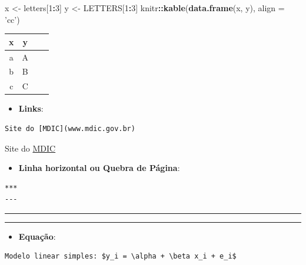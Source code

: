 \documentclass[]{book}
\newenvironment{Shaded}{\begin{snugshade}}{\end{snugshade}}
\newcommand{\KeywordTok}[1]{\textcolor[rgb]{0.13,0.29,0.53}{\textbf{#1}}}
\newcommand{\DataTypeTok}[1]{\textcolor[rgb]{0.13,0.29,0.53}{#1}}
\newcommand{\DecValTok}[1]{\textcolor[rgb]{0.00,0.00,0.81}{#1}}
\newcommand{\StringTok}[1]{\textcolor[rgb]{0.31,0.60,0.02}{#1}}
\newcommand{\OperatorTok}[1]{\textcolor[rgb]{0.81,0.36,0.00}{\textbf{#1}}}
\newcommand{\NormalTok}[1]{#1}
\providecommand{\tightlist}{%
  \setlength{\itemsep}{0pt}\setlength{\parskip}{0pt}}
\begin{document}
\begin{Shaded}
\begin{Highlighting}[]
\NormalTok{x <-}\StringTok{ }\NormalTok{letters[}\DecValTok{1}\OperatorTok{:}\DecValTok{3}\NormalTok{]}
\NormalTok{y <-}\StringTok{ }\NormalTok{LETTERS[}\DecValTok{1}\OperatorTok{:}\DecValTok{3}\NormalTok{]}
\NormalTok{knitr}\OperatorTok{::}\KeywordTok{kable}\NormalTok{(}\KeywordTok{data.frame}\NormalTok{(x, y), }\DataTypeTok{align =} \StringTok{'cc'}\NormalTok{)}
\end{Highlighting}
\end{Shaded}

\begin{tabular}{cc|cc}
\hline
x & y\\
\hline
a & A\\
\hline
b & B\\
\hline
c & C\\
\hline
\end{tabular}

\begin{itemize}
\tightlist
\item
  \textbf{Links}:
\end{itemize}

\begin{verbatim}
Site do [MDIC](www.mdic.gov.br)
\end{verbatim}

Site do \href{www.mdic.gov.br}{MDIC}

\begin{itemize}
\tightlist
\item
  \textbf{Linha horizontal ou Quebra de Página}:
\end{itemize}

\begin{verbatim}
***
---
\end{verbatim}

\begin{center}\rule{0.5\linewidth}{\linethickness}\end{center}

\begin{center}\rule{0.5\linewidth}{\linethickness}\end{center}

\begin{itemize}
\tightlist
\item
  \textbf{Equação}:
\end{itemize}

\begin{verbatim}
Modelo linear simples: $y_i = \alpha + \beta x_i + e_i$
\end{verbatim}
\end{document}
